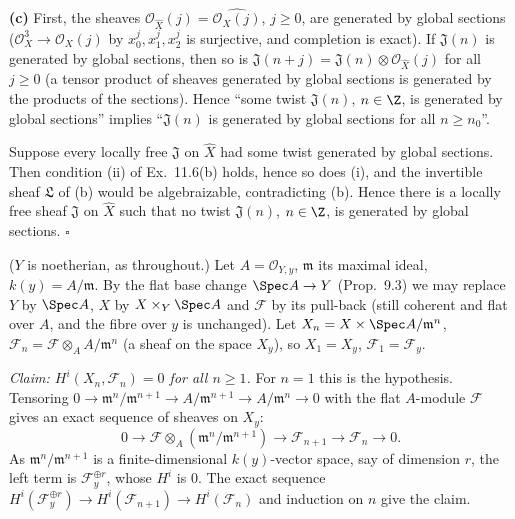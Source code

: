 \documentclass[11pt]{article}
\begin{document}
\textbf{(c)} First, the sheaves $\mathcal O_{\widehat X}(j)=\widehat{\mathcal O_X(j)}$, $j\ge0$, are generated by global sections ($\mathcal O_X^{3}\to\mathcal O_X(j)$ by $x_0^j,x_1^j,x_2^j$ is surjective, and completion is exact). If $\mathfrak J(n)$ is generated by global sections, then so is $\mathfrak J(n+j)=\mathfrak J(n)\otimes\mathcal O_{\widehat X}(j)$ for all $j\ge0$ (a tensor product of sheaves generated by global sections is generated by the products of the sections). Hence ``some twist $\mathfrak J(n)$, $n\in\Z$, is generated by global sections'' implies ``$\mathfrak J(n)$ is generated by global sections for all $n\ge n_0$''.

Suppose every locally free $\mathfrak J$ on $\widehat X$ had some twist generated by global sections. Then condition (ii) of Ex.~11.6(b) holds, hence so does (i), and the invertible sheaf $\mathfrak L$ of (b) would be algebraizable, contradicting (b). Hence there is a locally free sheaf $\mathfrak J$ on $\widehat X$ such that no twist $\mathfrak J(n)$, $n\in\Z$, is generated by global sections. \hfill$\square$

\pf
($Y$ is noetherian, as throughout.) Let $A=\mathcal O_{Y,y}$, $\mathfrak m$ its maximal ideal, $k(y)=A/\mathfrak m$. By the flat base change $\Spec A\to Y$ (Prop.~9.3) we may replace $Y$ by $\Spec A$, $X$ by $X\times_Y\Spec A$ and $\mathcal F$ by its pull-back (still coherent and flat over $A$, and the fibre over $y$ is unchanged). Let $X_n=X\times\Spec A/\mathfrak m^n$, $\mathcal F_n=\mathcal F\otimes_AA/\mathfrak m^n$ (a sheaf on the space $X_y$), so $X_1=X_y$, $\mathcal F_1=\mathcal F_y$.

\emph{Claim: $H^i(X_n,\mathcal F_n)=0$ for all $n\ge1$.} For $n=1$ this is the hypothesis. Tensoring $0\to\mathfrak m^n/\mathfrak m^{n+1}\to A/\mathfrak m^{n+1}\to A/\mathfrak m^n\to0$ with the flat $A$-module $\mathcal F$ gives an exact sequence of sheaves on $X_y$:
\[
0\to\mathcal F\otimes_A(\mathfrak m^n/\mathfrak m^{n+1})\to\mathcal F_{n+1}\to\mathcal F_n\to0 .
\]
As $\mathfrak m^n/\mathfrak m^{n+1}$ is a finite-dimensional $k(y)$-vector space, say of dimension $r$, the left term is $\mathcal F_y^{\oplus r}$, whose $H^i$ is $0$. The exact sequence $H^i(\mathcal F_y^{\oplus r})\to H^i(\mathcal F_{n+1})\to H^i(\mathcal F_n)$ and induction on $n$ give the claim.
\end{document}
